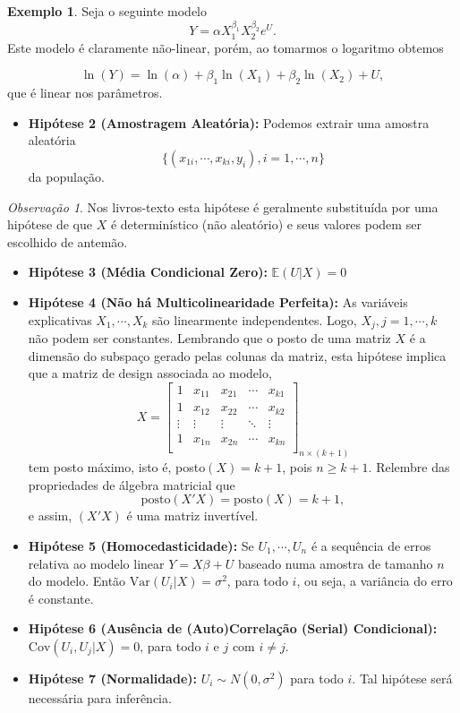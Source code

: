 \documentclass[
]{book}
\providecommand{\tightlist}{%
  \setlength{\itemsep}{0pt}\setlength{\parskip}{0pt}}
\theoremstyle{definition}
\theoremstyle{definition}
\newtheorem{example}{Exemplo}[chapter]
\theoremstyle{definition}
\theoremstyle{remark}
\newtheorem*{remark}{Observação}
\begin{document}
\begin{example}
\protect\hypertarget{exm:exmslp3}{}{\label{exm:exmslp3} }Seja o seguinte modelo \[Y=\alpha X_1^{\beta_1}X_2^{\beta_2}e^{U}.\]
Este modelo é claramente não-linear, porém, ao tomarmos o logaritmo obtemos

\[\ln (Y)=\ln (\alpha)+\beta_1\ln(X_1)+\beta_2\ln(X_2)+U,\]
que é linear nos parâmetros.
\end{example}

\begin{itemize}
\tightlist
\item
  \textbf{Hipótese 2 (Amostragem Aleatória): } Podemos extrair uma amostra aleatória
  \[\{(x_{1i},\cdots,x_{ki},y_i),i=1,\cdots,n\}\] da população.
\end{itemize}

\begin{remark}
{}Nos livros-texto esta hipótese é geralmente substituída por uma
hipótese de que \(X\) é determinístico (não aleatório) e seus valores podem ser escolhido de antemão.
\end{remark}

\begin{itemize}
\item
  \textbf{Hipótese 3 (Média Condicional Zero): } \(\mathbb{E}(U|X)=0\)
\item
  \textbf{Hipótese 4 (Não há Multicolinearidade Perfeita): } As variáveis explicativas \(X_1,\cdots,X_k\) são linearmente independentes. Logo, \(X_j,j=1,\cdots,k\) não podem ser constantes. Lembrando que o posto de uma matriz \(X\) é a dimensão do subspaço gerado pelas colunas da matriz, esta hipótese implica que a matriz de design associada ao modelo,
  \[X=\left[%
  \begin{array}{ccccc}
  1 & x_{11} & x_{21} & \cdots & x_{k1} \\
  1 & x_{12} & x_{22} & \cdots & x_{k2} \\
  \vdots & \vdots & \vdots & \ddots & \vdots \\
  1 & x_{1n} & x_{2n} & \cdots & x_{kn} \\
  \end{array}%
  \right]_{n \times (k+1)}\]
  tem posto máximo, isto é, posto\((X)=k+1\), pois \(n\geq k+1\). Relembre das propriedades de
  álgebra matricial que
  \[\mathrm{posto}(X'X)=\mathrm{posto}(X)=k+1,\]
  e assim, \((X'X)\) é uma matriz invertível.
\item
  \textbf{Hipótese 5 (Homocedasticidade): }
  Se \(U_1,\cdots,U_n\) é a sequência de erros relativa ao modelo linear \(Y=X{\beta}+U\) baseado numa amostra de tamanho \(n\) do modelo.
  Então \(\mbox{Var}(U_i|X)=\sigma^2\), para todo \(i\), ou seja, a variância do erro é constante.
\item
  \textbf{Hipótese 6 (Ausência de (Auto)Correlação (Serial) Condicional): } \(\mbox{Cov}(U_i,U_j|X)=0\), para todo \(i\) e \(j\) com \(i \neq j\).
\item
  \textbf{Hipótese 7 (Normalidade): } \(U_i \sim N(0,\sigma^2)\) para todo \(i\). Tal hipótese será necessária para inferência.
\end{itemize}
\end{document}
